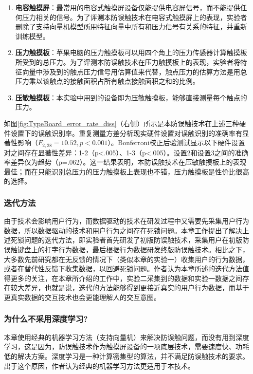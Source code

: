 \begin{enumerate}
	\item \textbf{电容触摸屏}：最常用的电容式触摸屏设备仅能提供电容屏信号，而不能提供任何压力相关的信号。为了评测本防误触技术在电容式触摸屏上的表现，实验者删除了支持向量机模型所用特征向量中所有和压力信号有关系的特征，并重新训练模型。
	\item \textbf{压力触摸板}：苹果电脑的压力触摸板可以用四个角上的压力传感器计算触摸板所受到的总压力。为了评测本防误触技术在压力触摸板上的表现，实验者将特征向量中涉及到的触点压力信号用估算值来代替，触点压力的估算方法是用总压力乘以该触点的接触面积占所有触点接触面积之和的比例。
	\item \textbf{压敏触摸板}：本实验中用到的设备即为压敏触摸板，能够直接测量每个触点的压力。
\end{enumerate}

如图\ref{fig:TypeBoard_error_rate_diss}（右侧）所示是本防误触技术在上述三种硬件设置下的误触识别率。重复测量方差分析现实硬件设置对误触识别的准确率有显著性影响（$F_{2,28}=10.52, p<0.001$）。Bonferroni校正后验测试显示以下硬件设置对之间存在显著性差异：1-2（p<.005）、1-3（p<.005）。设置2和设置3之间的准确率差异仅为趋势（p=.062）。这一结果表明，本防误触技术在压敏触摸板上的表现最佳；而在只能识别总压力的压力触摸板上表现也不错，压力触摸板是性价比很高的选择。

\subsubsection{迭代方法}

由于技术会影响用户行为，而数据驱动的技术在研发过程中又需要先采集用户行为数据，所以数据驱动的技术和用户行为之间存在死锁问题。本章工作提出了解决上述死锁问题的迭代方法，即实验者首先研发了初版防误触技术，采集用户在初版防误触键盘上的打字行为数据，最后根据行为数据研发终版防误触技术。相比之下，大多数先前研究都在无反馈的情况下（类似本章的实验一）收集用户的行为数据\cite{matero2012identifying, 2014-PenMightier, 2018-PalmTouch}，或者在替代性反馈下收集数据\cite{2013-TapBoard, 2020-TabletopTouch}，以回避死锁问题。作者认为本章所述的迭代方法值得更多的关注，在本章所介绍的工作中，实验二采集到的数据和实验一数据之间存在较大差异，也就是说，迭代的方法能够得到更接近真实的用户行为数据，而基于更真实数据的交互技术也会更能理解人的交互意图。

\subsubsection{为什么不采用深度学习?}

本章使用经典的机器学习方法（支持向量机）来解决防误触问题，而没有用到深度学习，这是因为，防误触技术作为触摸屏设备的一项底层技术，需要速度快、功耗低的解决方案。深度学习是一种计算密集型的算法，并不满足防误触技术的要求。出于这个原因，作者认为经典的机器学习方法更适用于本技术。

